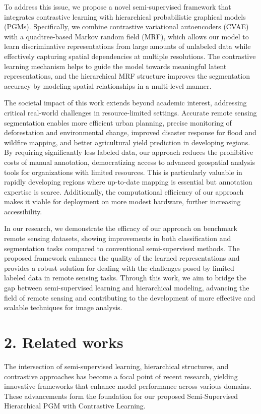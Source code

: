 \documentclass[conference]{IEEEtran}
\begin{document}
To address this issue, we propose a novel semi-supervised framework that integrates contrastive learning with hierarchical probabilistic graphical models (PGMs). Specifically, we combine contrastive variational autoencoders (CVAE) with a quadtree-based Markov random field (MRF), which allows our model to learn discriminative representations from large amounts of unlabeled data while effectively capturing spatial dependencies at multiple resolutions\cite{zerubia2021hierarchical}. The contrastive learning mechanism helps to guide the model towards meaningful latent representations, and the hierarchical MRF structure improves the segmentation accuracy by modeling spatial relationships in a multi-level manner\cite{jain2022multimodal}.

The societal impact of this work extends beyond academic interest, addressing critical real-world challenges in resource-limited settings. Accurate remote sensing segmentation enables more efficient urban planning, precise monitoring of deforestation and environmental change, improved disaster response for flood and wildfire mapping, and better agricultural yield prediction in developing regions. By requiring significantly less labeled data, our approach reduces the prohibitive costs of manual annotation, democratizing access to advanced geospatial analysis tools for organizations with limited resources. This is particularly valuable in rapidly developing regions where up-to-date mapping is essential but annotation expertise is scarce. Additionally, the computational efficiency of our approach makes it viable for deployment on more modest hardware, further increasing accessibility.

In our research, we demonstrate the efficacy of our approach on benchmark remote sensing datasets, showing improvements in both classification and segmentation tasks compared to conventional semi-supervised methods\cite{wang2022enhancing}. The proposed framework enhances the quality of the learned representations and provides a robust solution for dealing with the challenges posed by limited labeled data in remote sensing tasks. Through this work, we aim to bridge the gap between semi-supervised learning and hierarchical modeling, advancing the field of remote sensing and contributing to the development of more effective and scalable techniques for image analysis\cite{pastorino2021hierarchical}.

\section*{2. Related works}
The intersection of semi-supervised learning, hierarchical structures, and contrastive approaches has become a focal point of recent research, yielding innovative frameworks that enhance model performance across various domains. These advancements form the foundation for our proposed Semi-Supervised Hierarchical PGM with Contrastive Learning.
\end{document}
